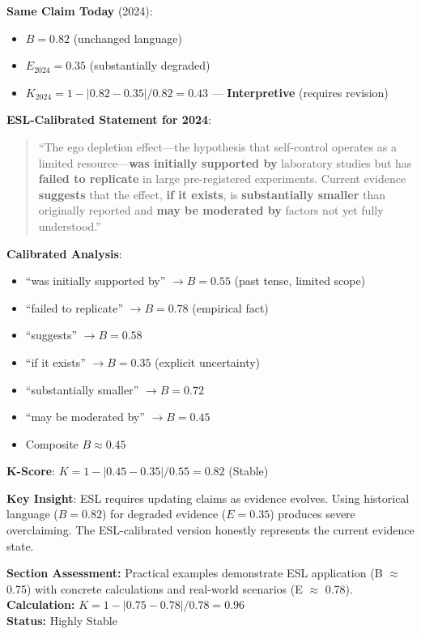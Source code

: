 \documentclass[11pt,a4paper]{article}
\begin{document}
\textbf{Same Claim Today} (2024):
\begin{itemize}
    \item $B = 0.82$ (unchanged language)
    \item $E_{2024} = 0.35$ (substantially degraded)
    \item $K_{2024} = 1 - |0.82 - 0.35| / 0.82 = 0.43$ --- \textbf{Interpretive} (requires revision)
\end{itemize}

\textbf{ESL-Calibrated Statement for 2024}:
\begin{quote}
``The ego depletion effect---the hypothesis that self-control operates as a limited resource---\textbf{was initially supported by} laboratory studies but has \textbf{failed to replicate} in large pre-registered experiments. Current evidence \textbf{suggests} that the effect, \textbf{if it exists}, is \textbf{substantially smaller} than originally reported and \textbf{may be moderated by} factors not yet fully understood.''
\end{quote}

\textbf{Calibrated Analysis}:
\begin{itemize}
    \item ``was initially supported by'' $\to B = 0.55$ (past tense, limited scope)
    \item ``failed to replicate'' $\to B = 0.78$ (empirical fact)
    \item ``suggests'' $\to B = 0.58$
    \item ``if it exists'' $\to B = 0.35$ (explicit uncertainty)
    \item ``substantially smaller'' $\to B = 0.72$
    \item ``may be moderated by'' $\to B = 0.45$
    \item Composite $B \approx 0.45$
\end{itemize}

\textbf{K-Score}: $K = 1 - |0.45 - 0.35| / 0.55 = 0.82$ (Stable)

\textbf{Key Insight}: ESL requires updating claims as evidence evolves. Using historical language ($B = 0.82$) for degraded evidence ($E = 0.35$) produces severe overclaiming. The ESL-calibrated version honestly represents the current evidence state.

\begin{eslbox}
\textbf{Section Assessment:} Practical examples demonstrate ESL application (B $\approx$ 0.75) with concrete calculations and real-world scenarios (E $\approx$ 0.78). \\[0.3em]
\textbf{Calculation:} $K = 1 - |0.75 - 0.78| / 0.78 = 0.96$ \\
\textbf{Status:} Highly Stable
\end{eslbox}
\end{document}
